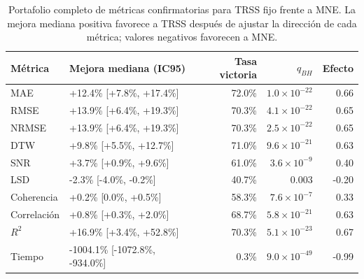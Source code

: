 \begin{table}[htbp]
\centering
\footnotesize
\caption{Portafolio completo de métricas confirmatorias para TRSS fijo frente a MNE. La mejora mediana positiva favorece a TRSS después de ajustar la dirección de cada métrica; valores negativos favorecen a MNE.}
\label{tab:ch6_metric_portfolio}
\begin{tabular}{@{}lp{3.4cm}rrr@{}}
\toprule
Métrica & Mejora mediana (IC95) & Tasa victoria & $q_{BH}$ & Efecto \\
\midrule
MAE & +12.4\% [+7.8\%, +17.4\%] & 72.0\% & $1.0\times 10^{-22}$ & 0.66 \\
RMSE & +13.9\% [+6.4\%, +19.3\%] & 70.3\% & $4.1\times 10^{-22}$ & 0.65 \\
NRMSE & +13.9\% [+6.4\%, +19.3\%] & 70.3\% & $2.5\times 10^{-22}$ & 0.65 \\
DTW & +9.8\% [+5.5\%, +12.7\%] & 71.0\% & $9.6\times 10^{-21}$ & 0.63 \\
SNR & +3.7\% [+0.9\%, +9.6\%] & 61.0\% & $3.6\times 10^{-9}$ & 0.40 \\
LSD & -2.3\% [-4.0\%, -0.2\%] & 40.7\% & 0.003 & -0.20 \\
Coherencia & +0.2\% [0.0\%, +0.5\%] & 58.3\% & $7.6\times 10^{-7}$ & 0.33 \\
Correlación & +0.8\% [+0.3\%, +2.0\%] & 68.7\% & $5.8\times 10^{-21}$ & 0.63 \\
$R^2$ & +16.9\% [+3.4\%, +52.8\%] & 70.3\% & $5.1\times 10^{-23}$ & 0.67 \\
Tiempo & -1004.1\% [-1072.8\%, -934.0\%] & 0.3\% & $9.0\times 10^{-49}$ & -0.99 \\
\bottomrule
\end{tabular}
\end{table}
